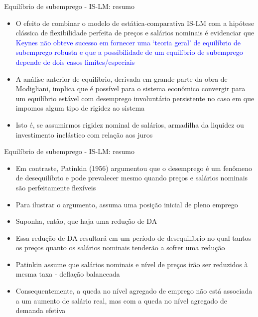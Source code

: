 \documentclass[10pt]{beamer}
\begin{document}
\begin{frame}{Equilíbrio de subemprego - IS-LM: resumo}
    \begin{itemize}
        \item O efeito de combinar o modelo de estática-comparativa IS-LM com a hipótese clássica de flexibilidade perfeita de preços e salários nominais é evidenciar que \textcolor{blue}{Keynes não obteve sucesso em fornecer uma `teoria geral' de equilíbrio de subemprego robusta e que a possibilidade de um equilíbrio de subemprego depende de dois casos limites/especiais}
        \bigskip
        \item A análise anterior de equilíbrio, derivada em grande parte da obra de Modigliani, implica que é possível para o sistema econômico convergir para um equilíbrio estável com desemprego involuntário persistente no caso em que impomos algum tipo de rigidez ao sistema
        \bigskip
        \item Isto é, se assumirmos rigidez nominal de salários, armadilha da liquidez ou investimento inelástico com relação aos juros
    \end{itemize}
\end{frame}

\begin{frame}{Equilíbrio de subemprego - IS-LM: resumo}
    \begin{itemize}
        \item Em contraste, Patinkin (1956) argumentou que o desemprego é um fenômeno de desequilíbrio e pode prevalecer mesmo quando preços e salários nominais são perfeitamente flexíveis
        \bigskip
        \item Para ilustrar o argumento, assuma uma posição inicial de pleno emprego
        \bigskip
        \item Suponha, então, que haja uma redução de DA
        \bigskip
        \item Essa redução de DA resultará em um período de desequilíbrio no qual tantos os preços quanto os salários nominais tenderão a sofrer uma redução
        \bigskip
        \item Patinkin assume que salários nominais e nível de preços irão ser reduzidos à mesma taxa - deflação balanceada
        \bigskip
        \item Consequentemente, a queda no nível agregado de emprego não está associada a um aumento de salário real, mas com a queda no nível agregado de demanda efetiva
    \end{itemize}
\end{frame}
\end{document}
